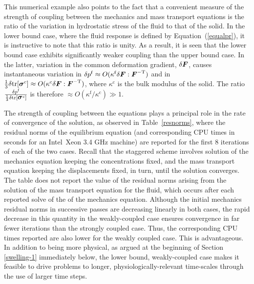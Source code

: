 This numerical example also points to the fact that a convenient
measure of the strength of coupling between the mechanics and mass
transport equations is the ratio of the variation in hydrostatic
stress of the fluid to that of the solid. In the lower bound case,
where the fluid response is defined by Equation~(\ref{equalpr}), it is
instructive to note that this ratio is unity. As a result, it is seen
that the lower bound case exhibits significantly weaker coupling than
the upper bound case. In the latter, variation in the common
deformation gradient, $\delta \mbox{\boldmath$ F$}$, causes instantaneous variation in
\mbox{$\delta p^{\mathrm{f}} \approx O(\kappa^{\mathrm{f}} \delta
  \mbox{\boldmath$ F$}:\mbox{\boldmath$ F$}^{-\mathrm{T}})$} and in \mbox{$\frac{1}{3}
  \delta\mathrm{\small{tr}}[\mbox{\boldmath$\sigma$}^{c}] \approx O(\kappa^{\mathrm{c}}
  \delta \mbox{\boldmath$ F$}:\mbox{\boldmath$ F$}^{-\mathrm{T}})$}, where $\kappa^{\mathrm{c}}$ is the
bulk modulus of the solid. The ratio $\frac{\delta
  p^{\mathrm{f}}}{\frac{1}{3} \delta
  \mathrm{\small{tr}}[\mbox{\boldmath$\sigma$}^{c}]}$ is therefore \mbox{$\approx
  O(\kappa^{\mathrm{f}}/\kappa^{\mathrm{c}}) \gg 1$}.

The strength of coupling between the equations plays a principal role
in the rate of convergence of the solution, as observed in
Table~\ref{resnorms}, where the residual norms of the equilibrium
equation (and corresponding CPU times in seconds for an
\mbox{Intel\textregistered\ Xeon} 3.4 GHz machine) are reported for the first
8 iterations of each of the two cases. Recall that the staggered
scheme involves solution of the mechanics equation keeping the
concentrations fixed, and the mass transport equation keeping the
displacements fixed, in turn, until the solution converges. The table
does not report the value of the residual norms arising from the
solution of the mass transport equation for the fluid, which occurs
after each reported solve of the of the mechanics equation. Although
the initial mechanics residual norms in successive passes are
decreasing linearly in both cases, the rapid decrease in this quantity
in the weakly-coupled case ensures convergence in far fewer iterations
than the strongly coupled case. Thus, the corresponding CPU times
reported are also lower for the weakly coupled case. This is
advantageous. In addition to being more physical, as argued at the
beginning of Section \ref{swelling-1} immediately below, the lower
bound, weakly-coupled case makes it feasible to drive problems to
longer, physiologically-relevant time-scales through the use of larger
time steps.



